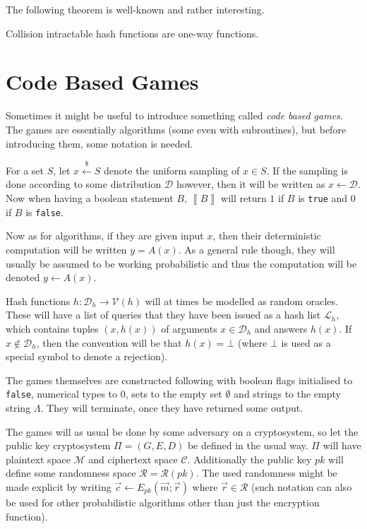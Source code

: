 The following theorem is well-known and rather interesting.
\begin{thm}
\label{thm:collIntrMeansOneWay}
	Collision intractable hash functions are one-way functions.
\end{thm}




\section{Code Based Games}
\label{sec:CodBasGam}

Sometimes it might be useful to introduce something called \emph{code based games}. The games are essentially algorithms (some even with subroutines), but before introducing them, some notation is needed.

For a set $S$, let $x \xleftarrow{\$} S$ denote the uniform sampling of $x \in S$. If the sampling is done according to some distribution $\mathcal{D}$ however, then it will be written as $x \leftarrow \mathcal{D}$. Now when having a boolean statement $B$, $\left\llbracket B \right\rrbracket$ will return $1$ if $B$ is \texttt{true} and $0$ if $B$ is \texttt{false}.

Now as for algorithms, if they are given input $x$, then their deterministic computation will be written $y = A\left(x\right)$. As a general rule though, they will usually be assumed to be working probabilistic and thus the computation will be denoted $y \leftarrow A\left(x\right)$.

Hash functions $h: \mathcal{D}_h \rightarrow \mathcal{V}\left(h\right)$ will at times be modelled as random oracles. These will have a list of queries that they have been issued as a hash list $\mathcal{L}_h$, which contains tuples $\left(x, h\left(x\right)\right)$ of arguments $x \in \mathcal{D}_h$ and answers $h\left(x\right)$. If $x \notin \mathcal{D}_h$, then the convention will be that $h\left(x\right) = \bot$ (where $\bot$ is used as a special symbol to denote a rejection).

The games themselves are constructed following \cite{shoup,BR} with boolean flags initialised to \texttt{false}, numerical types to $0$, sets to the empty set $\emptyset$ and strings to the empty string $\Lambda$. They will terminate, once they have returned some output.

The games will as usual be done by some adversary on a cryptosystem, so let the public key cryptosystem $\Pi = \left(G,E,D\right)$ be defined in the usual way. $\Pi$ will have plaintext space $\mathcal{M}$ and ciphertext space $\mathcal{C}$. Additionally the public key $pk$ will define some randomness space $\mathcal{R} = \mathcal{R}\left(pk\right)$. The used randomness might be made explicit by writing $\vec{c} \leftarrow E_{pk}\left(\vec{m}; \vec{r}\right)$ where $\vec{r} \in \mathcal{R}$ (such notation can also be used for other probabilistic algorithms other than just the encryption function).

